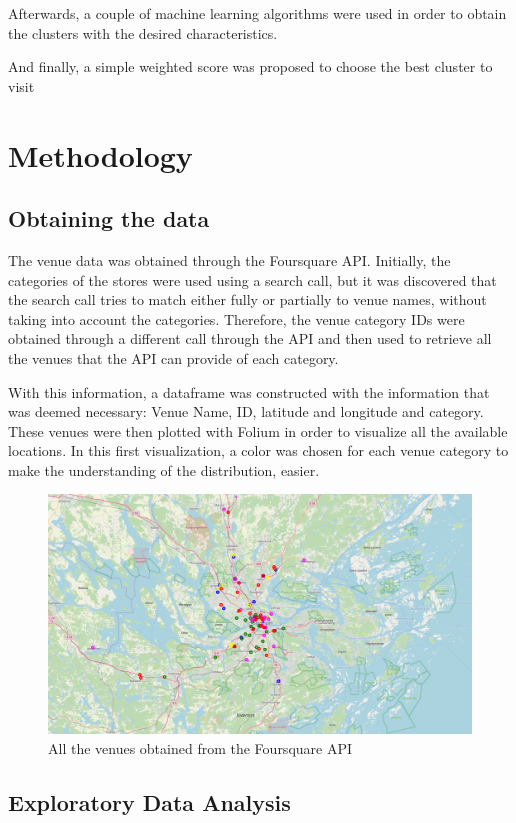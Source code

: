 \documentclass{article}
\begin{document}
			Afterwards, a couple of machine learning algorithms were used in order to obtain the clusters with the desired characteristics. 
			
			And finally, a simple weighted score was proposed to choose the best cluster to visit
			
\section{Methodology}

	\subsection{Obtaining the data}
		The venue data was obtained through the Foursquare API. Initially, the categories of the stores were used using a search call, but it was discovered that the search call tries to match either fully or partially to venue names, without taking into account the categories.
		Therefore, the venue category IDs were obtained through a different call through the API and then used to retrieve all the venues that the API can provide of each category.
		
		With this information, a dataframe was constructed with the information that was deemed necessary: Venue Name, ID, latitude and longitude and category. These venues were then plotted with Folium in order to visualize all the available locations. In this first visualization, a color was chosen for each venue category to make the understanding of the distribution, easier. 
		\begin{figure}[H]
			\centering
			\includegraphics[width=\textwidth]{img/map1.jpg}
			\caption{All the venues obtained from the Foursquare API}
			\label{fig::map1}
		\end{figure}
	\subsection{Exploratory Data Analysis}
	
\end{document}
